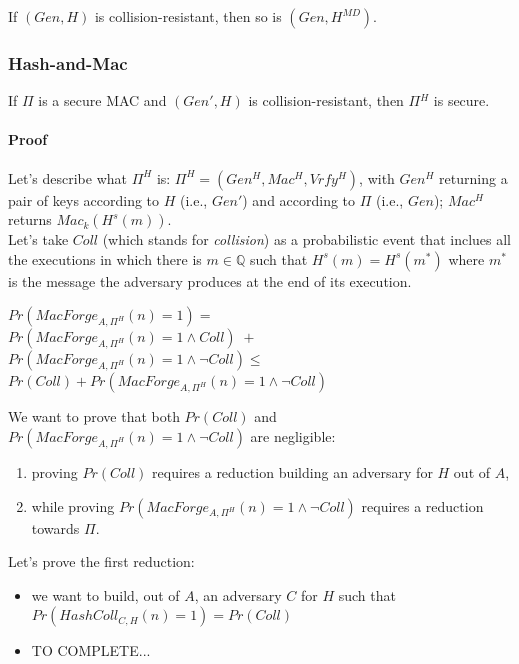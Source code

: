 \documentclass[../main]{subfiles}
\begin{document}
\begin{theorem}
    If $(Gen, H)$ is collision-resistant, then so is $(Gen, H^{MD})$.
\end{theorem}
\subsubsection{Hash-and-Mac}
\begin{theorem}
    If $\Pi{}$ is a secure MAC and $(Gen', H)$ is collision-resistant, then $\Pi{}^H$ is secure. 
\end{theorem}

\paragraph{Proof}
Let's describe what $\Pi^H$ is: $\Pi^H = (Gen^H, Mac^H, Vrfy^H)$, with $Gen^H$ returning a pair of keys according to $H$ (i.e., $Gen'$) and according to $\Pi$ (i.e., $Gen$); $Mac^H$ returns $Mac_k(H^s(m))$.\\
Let's take $Coll$ (which stands for \textit{collision}) as a probabilistic event that inclues all the executions in which there is $m \in{} \mathbb{Q}$ such that $H^s(m) = H^s(m^*)$ where $m^*$ is the message the adversary produces at the end of its execution.
\begin{center}
    $Pr(MacForge_{A,\Pi^H}(n)=1) =$\\
    $Pr(MacForge_{A,\Pi^H}(n)=1 \wedge{} Coll)\; +$
    $Pr(MacForge_{A,\Pi^H}(n)=1 \wedge{} \neg{}Coll) \leq{}$
    $Pr(Coll) + Pr(MacForge_{A,\Pi^H}(n)=1 \wedge{} \neg{}Coll)$
\end{center}
We want to prove that both $Pr(Coll)$ and $Pr(MacForge_{A,\Pi^H}(n)=1 \wedge{} \neg{}Coll)$ are negligible:
\begin{enumerate}
    \item proving $Pr(Coll)$ requires a reduction building an adversary for $H$ out of $A$,
    \item while proving $Pr(MacForge_{A,\Pi^H}(n)=1 \wedge{} \neg{}Coll)$ requires a reduction towards $\Pi$.
\end{enumerate}
Let's prove the first reduction:
\begin{itemize}
    \item we want to build, out of $A$, an adversary $C$ for $H$ such that $Pr(HashColl_{C,H}(n)=1)=Pr(Coll)$
    \item TO COMPLETE...
\end{itemize}
\end{document}
